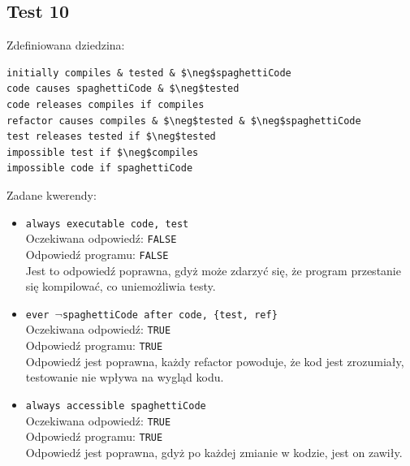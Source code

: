 \documentclass{article}
\begin{document}
\subsection{Test 10}
Zdefiniowana dziedzina:
\begin{lstlisting}[mathescape=true]
initially compiles & tested & $\neg$spaghettiCode
code causes spaghettiCode & $\neg$tested
code releases compiles if compiles
refactor causes compiles & $\neg$tested & $\neg$spaghettiCode
test releases tested if $\neg$tested
impossible test if $\neg$compiles
impossible code if spaghettiCode
\end{lstlisting}
Zadane kwerendy:
\begin{itemize}
    \item {\large\texttt{always executable code, test}}\\
	Oczekiwana odpowiedź: \texttt{FALSE}\\
    Odpowiedź programu: \texttt{FALSE}\\
    Jest to odpowiedź poprawna, gdyż może zdarzyć się, że program przestanie się kompilować, co uniemożliwia testy.
	
    \item {\large\texttt{ever $\neg$spaghettiCode after code, \{test, ref\}}}\\
	Oczekiwana odpowiedź: \texttt{TRUE}\\
    Odpowiedź programu: \texttt{TRUE}\\
    Odpowiedź jest poprawna, każdy refactor powoduje, że kod jest zrozumiały, testowanie nie wpływa na wygląd kodu.

	\item {\large\texttt{always accessible spaghettiCode }}\\
	Oczekiwana odpowiedź: \texttt{TRUE}\\
	Odpowiedź programu: \texttt{TRUE}\\
    Odpowiedź jest poprawna, gdyż po każdej zmianie w kodzie, jest on zawiły.

\end{itemize}
\end{document}
